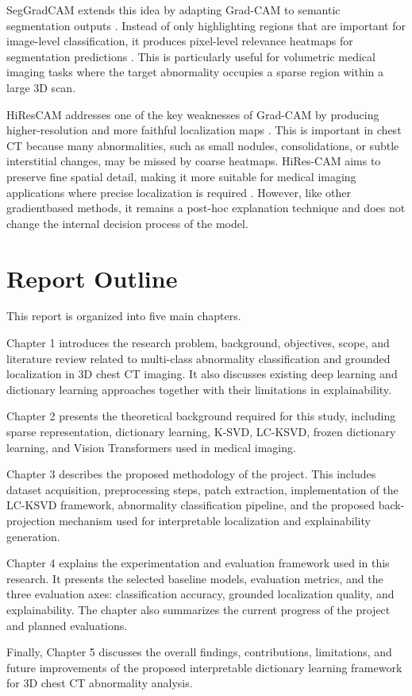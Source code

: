 SegGradCAM extends this idea by adapting Grad-CAM to semantic segmentation outputs \cite{Suara_2024}. 
Instead of only highlighting regions that are important for image-level classification, it produces pixel-level relevance heatmaps for
segmentation predictions \cite{Suara_2024}.
This is particularly useful for volumetric medical imaging tasks where the target abnormality occupies a sparse region within a large 3D scan.

HiResCAM addresses one of the key weaknesses of Grad-CAM by producing higher-resolution and more faithful localization maps \cite{draelos2021usehirescaminsteadgradcam}. 
This is important in chest CT because many abnormalities, such as small nodules, consolidations, or subtle interstitial changes,
may be missed by coarse heatmaps. 
HiRes-CAM aims to preserve fine spatial detail, making it more suitable for medical imaging applications where precise localization is required \cite{draelos2021usehirescaminsteadgradcam}. 
However, like other gradientbased methods, it remains a post-hoc explanation technique and does not change the internal decision process of the model.

\section{Report Outline}

This report is organized into five main chapters.

Chapter 1 introduces the research problem, background, objectives, scope, and literature review related to multi-class abnormality classification and grounded localization in 3D chest CT imaging. It also discusses existing deep learning and dictionary learning approaches together with their limitations in explainability.

Chapter 2 presents the theoretical background required for this study, including sparse representation, dictionary learning, K-SVD, LC-KSVD, frozen dictionary learning, and Vision Transformers used in medical imaging.


Chapter 3 describes the proposed methodology of the project. This includes dataset acquisition, preprocessing steps, patch extraction, implementation of the LC-KSVD framework, abnormality classification pipeline, and the proposed back-projection mechanism used for interpretable localization and explainability generation.

Chapter 4 explains the experimentation and evaluation framework used in this research. It presents the selected baseline models, evaluation metrics, and the three evaluation axes: classification accuracy, grounded localization quality, and explainability. The chapter also summarizes the current progress of the project and planned evaluations.

Finally, Chapter 5 discusses the overall findings, contributions, limitations, and future improvements of the proposed interpretable dictionary learning framework for 3D chest CT abnormality analysis.



